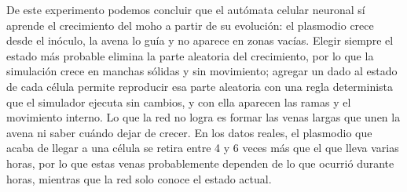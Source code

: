 De este experimento podemos concluir que el autómata celular neuronal sí aprende el crecimiento del moho a partir de su evolución: el plasmodio crece desde el inóculo, la avena lo guía y no aparece en zonas vacías. Elegir siempre el estado más probable elimina la parte aleatoria del crecimiento, por lo que la simulación crece en manchas sólidas y sin movimiento; agregar un dado al estado de cada célula permite reproducir esa parte aleatoria con una regla determinista que el simulador ejecuta sin cambios, y con ella aparecen las ramas y el movimiento interno. Lo que la red no logra es formar las venas largas que unen la avena ni saber cuándo dejar de crecer. En los datos reales, el plasmodio que acaba de llegar a una célula se retira entre 4 y 6 veces más que el que lleva varias horas, por lo que estas venas probablemente dependen de lo que ocurrió durante horas, mientras que la red solo conoce el estado actual.
